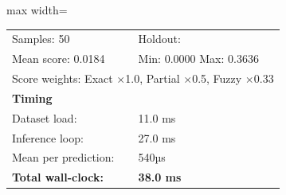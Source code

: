 \begin{table}[htbp]
\begin{adjustbox}{max width=\textwidth}
\begin{tabular}{r p{5cm} r r r r}
\midrule
\multicolumn{3}{l}{Samples: 50} & \multicolumn{3}{l}{Holdout: } \\
\multicolumn{3}{l}{Mean score: 0.0184} & \multicolumn{3}{l}{Min: 0.0000 \quad Max: 0.3636} \\
\multicolumn{6}{l}{Score weights: Exact $\times$1.0, Partial $\times$0.5, Fuzzy $\times$0.33} \\
\midrule
\multicolumn{6}{l}{\textbf{Timing}} \\
\midrule
\multicolumn{3}{l}{Dataset load:} & \multicolumn{3}{l}{11.0 ms} \\
\multicolumn{3}{l}{Inference loop:} & \multicolumn{3}{l}{27.0 ms} \\
\multicolumn{3}{l}{Mean per prediction:} & \multicolumn{3}{l}{540µs} \\
\multicolumn{3}{l}{\textbf{Total wall-clock:}} & \multicolumn{3}{l}{\textbf{38.0 ms}} \\
\bottomrule
\end{tabular}
\end{adjustbox}
\end{table}
